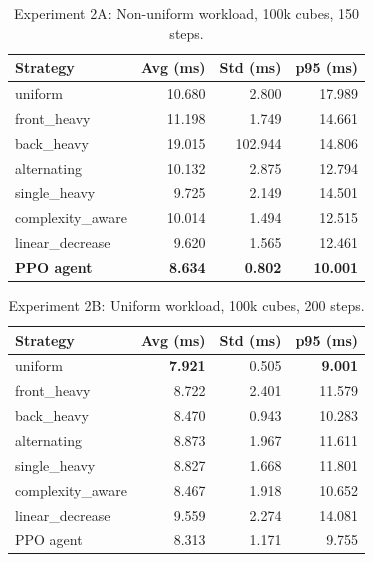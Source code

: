 \documentclass[9pt,openany]{extbook}
\begin{document}
\begin{table}[H]
  \centering
  \caption{Experiment 2A: Non-uniform workload, 100k cubes, 150 steps.}
  \label{tab:job_nonuniform}
  \begin{tabular}{lrrr}
    \toprule
    Strategy          & Avg (ms) & Std (ms) & p95 (ms) \\
    \midrule
    uniform           & 10.680 & 2.800  & 17.989 \\
    front\_heavy      & 11.198 & 1.749  & 14.661 \\
    back\_heavy       & 19.015 & 102.944 & 14.806 \\
    alternating       & 10.132 & 2.875  & 12.794 \\
    single\_heavy     & 9.725  & 2.149  & 14.501 \\
    complexity\_aware & 10.014 & 1.494  & 12.515 \\
    linear\_decrease  & 9.620  & 1.565  & 12.461 \\
    \midrule
    \textbf{PPO agent} & \textbf{8.634} & \textbf{0.802} & \textbf{10.001} \\
    \bottomrule
  \end{tabular}
\end{table}

\begin{table}[H]
  \centering
  \caption{Experiment 2B: Uniform workload, 100k cubes, 200 steps.}
  \label{tab:job_uniform}
  \begin{tabular}{lrrr}
    \toprule
    Strategy          & Avg (ms) & Std (ms) & p95 (ms) \\
    \midrule
    uniform           & \textbf{7.921} & 0.505 & \textbf{9.001} \\
    front\_heavy      & 8.722 & 2.401 & 11.579 \\
    back\_heavy       & 8.470 & 0.943 & 10.283 \\
    alternating       & 8.873 & 1.967 & 11.611 \\
    single\_heavy     & 8.827 & 1.668 & 11.801 \\
    complexity\_aware & 8.467 & 1.918 & 10.652 \\
    linear\_decrease  & 9.559 & 2.274 & 14.081 \\
    \midrule
    PPO agent         & 8.313 & 1.171 & 9.755 \\
    \bottomrule
  \end{tabular}
\end{table}
\end{document}
